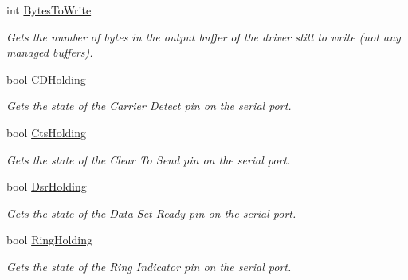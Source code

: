 \begin{DoxyCompactItemize}
int \mbox{\hyperlink{interface_r_j_c_p_1_1_i_o_1_1_ports_1_1_native_1_1_i_native_serial_a7a110be73c7dd3a8d4a28e043d27dea5}{Bytes\+To\+Write}}
\begin{DoxyCompactList}\small\item\em Gets the number of bytes in the output buffer of the driver still to write (not any managed buffers). \end{DoxyCompactList}\item 
bool \mbox{\hyperlink{interface_r_j_c_p_1_1_i_o_1_1_ports_1_1_native_1_1_i_native_serial_a4f7b0b93b5e18cb79eaf1965fceff422}{C\+D\+Holding}}
\begin{DoxyCompactList}\small\item\em Gets the state of the Carrier Detect pin on the serial port. \end{DoxyCompactList}\item 
bool \mbox{\hyperlink{interface_r_j_c_p_1_1_i_o_1_1_ports_1_1_native_1_1_i_native_serial_ab2bb261a340690035fd01c2aec04f9e9}{Cts\+Holding}}
\begin{DoxyCompactList}\small\item\em Gets the state of the Clear To Send pin on the serial port. \end{DoxyCompactList}\item 
bool \mbox{\hyperlink{interface_r_j_c_p_1_1_i_o_1_1_ports_1_1_native_1_1_i_native_serial_aeea9f95865d4059b3d1119bc87841b91}{Dsr\+Holding}}
\begin{DoxyCompactList}\small\item\em Gets the state of the Data Set Ready pin on the serial port. \end{DoxyCompactList}\item 
bool \mbox{\hyperlink{interface_r_j_c_p_1_1_i_o_1_1_ports_1_1_native_1_1_i_native_serial_af6b39a872524272aadaf58d1ae2c86fd}{Ring\+Holding}}
\begin{DoxyCompactList}\small\item\em Gets the state of the Ring Indicator pin on the serial port. \end{DoxyCompactList}\item 

\end{DoxyCompactItemize}

